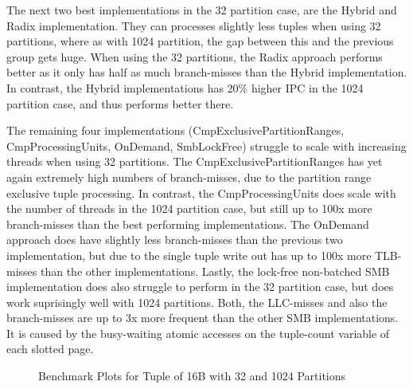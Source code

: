 The next two best implementations in the 32 partition case, are the Hybrid and Radix implementation.
They can processes slightly less tuples when using 32 partitions, where as with 1024 partition, the gap between this and the previous group gets huge.
When using the 32 partitions, the Radix approach performs better as it only has half as much branch-misses than the Hybrid implementation.
In contrast, the Hybrid implementations has 20\% higher \ac{IPC} in the 1024 partition case, and thus performs better there.

The remaining four implementations (CmpExclusivePartitionRanges, CmpProcessingUnits, OnDemand, SmbLockFree) struggle to scale with increasing threads when using 32 partitions.
The CmpExclusivePartitionRanges has yet again extremely high numbers of branch-misses, due to the partition range exclusive tuple processing.
In contrast, the CmpProcessingUnits does scale with the number of threads in the 1024 partition case, but still up to 100x more branch-misses than the best performing implementations.
The OnDemand approach does have slightly less branch-misses than the previous two implementation, but due to the single tuple write out has up to 100x more \ac{TLB}-misses than the other implementations.
Lastly, the lock-free non-batched \ac{SMB} implementation does also struggle to perform in the 32 partition case, but does work suprisingly well with 1024 partitions.
Both, the LLC-misses and also the branch-misses are up to 3x more frequent than the other \ac{SMB} implementations.
It is caused by the busy-waiting atomic accesses on the tuple-count variable of each slotted page.
\begin{figure}[h]
  \centering
  \begin{subfigure}{.49\textwidth}
    \centering
    \resizebox{\linewidth}{!}{}
  \end{subfigure}
  \begin{subfigure}{.49\textwidth}
    \centering
    \resizebox{\linewidth}{!}{}
  \end{subfigure}
  \begin{subfigure}{\textwidth}
    \centering
    \resizebox{\linewidth}{!}{}
  \end{subfigure}
  \caption[Shuffle Benchmark Plots for Tuple of 16B with 32 and 1024 Partitions]{Benchmark Plots for Tuple of 16B with 32 and 1024 Partitions}
  \label{plot-shuffle-16B-32-1024}
\end{figure}

